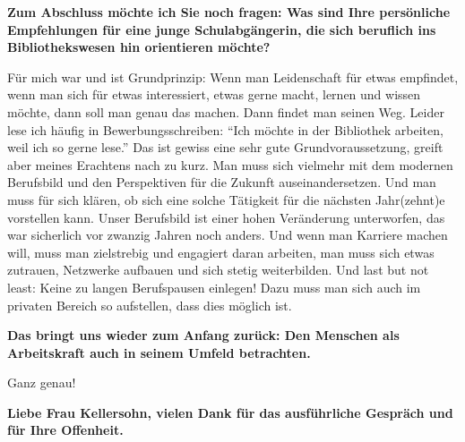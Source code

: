 \documentclass[a4paper,
fontsize=11pt,
oneside,
numbers=noperiodatend,
parskip=half-,
bibliography=totoc,
final
]{scrartcl}
\begin{document}
\textbf{Zum Abschluss möchte ich Sie noch fragen: Was sind Ihre
persönliche Empfehlungen für eine junge Schulabgängerin, die sich
beruflich ins Bibliothekswesen hin orientieren möchte?~}

Für mich war und ist Grundprinzip: Wenn man Leidenschaft für etwas
empfindet, wenn man sich für etwas interessiert, etwas gerne macht,
lernen und wissen möchte, dann soll man genau das machen. Dann findet
man seinen Weg. Leider lese ich häufig in Bewerbungsschreiben:
\enquote{Ich möchte in der Bibliothek arbeiten, weil ich so gerne lese.}
Das ist gewiss eine sehr gute Grundvoraussetzung, greift aber meines
Erachtens nach zu kurz. Man muss sich vielmehr mit dem modernen
Berufsbild und den Perspektiven für die Zukunft auseinandersetzen. Und
man muss für sich klären, ob sich eine solche Tätigkeit für die nächsten
Jahr(zehnt)e vorstellen kann. Unser Berufsbild ist einer hohen
Veränderung unterworfen, das war sicherlich vor zwanzig Jahren noch
anders. Und wenn man Karriere machen will, muss man zielstrebig und
engagiert daran arbeiten, man muss sich etwas zutrauen, Netzwerke
aufbauen und sich stetig weiterbilden. Und last but not least: Keine zu
langen Berufspausen einlegen! Dazu muss man sich auch im privaten
Bereich so aufstellen, dass dies möglich ist.

\textbf{Das bringt uns wieder zum Anfang zurück: Den Menschen als
Arbeitskraft auch in seinem Umfeld betrachten.}

Ganz genau!

\textbf{Liebe Frau Kellersohn, vielen Dank für das ausführliche Gespräch
und für Ihre Offenheit.}

\end{document}
